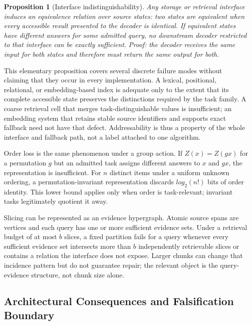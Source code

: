 \documentclass[11pt]{article}
\newtheorem{proposition}{Proposition}
\begin{document}
\begin{proposition}[Interface indistinguishability]
Any storage or retrieval interface induces an equivalence relation over source states: two states are equivalent when every accessible result presented to the decoder is identical. If equivalent states have different answers for some admitted query, no downstream decoder restricted to that interface can be exactly sufficient. Proof: the decoder receives the same input for both states and therefore must return the same output for both.
\end{proposition}

This elementary proposition covers several discrete failure modes without claiming that they occur in every implementation. A lexical, positional, relational, or embedding-based index is adequate only to the extent that its complete accessible state preserves the distinctions required by the task family. A coarse retrieval cell that merges task-distinguishable values is insufficient; an embedding system that retains stable source identifiers and supports exact fallback need not have that defect. Addressability is thus a property of the whole interface and fallback path, not a label attached to one algorithm.

Order loss is the same phenomenon under a group action. If $Z(x)=Z(gx)$ for a permutation $g$ but an admitted task assigns different answers to $x$ and $gx$, the representation is insufficient. For $n$ distinct items under a uniform unknown ordering, a permutation-invariant representation discards $log_2(n!)$ bits of order identity. This lower bound applies only when order is task-relevant; invariant tasks legitimately quotient it away.

Slicing can be represented as an evidence hypergraph. Atomic source spans are vertices and each query has one or more sufficient evidence sets. Under a retrieval budget of at most $b$ slices, a fixed partition fails for a query whenever every sufficient evidence set intersects more than $b$ independently retrievable slices or contains a relation the interface does not expose. Larger chunks can change that incidence pattern but do not guarantee repair; the relevant object is the query-evidence structure, not chunk size alone.

\subsection{Architectural Consequences and Falsification Boundary}
\end{document}
